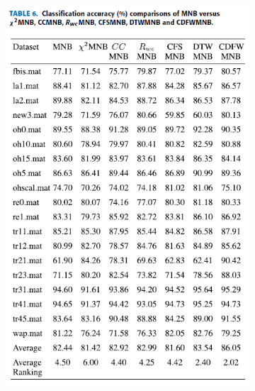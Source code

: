 \documentclass[12pt, a4paper]{article}
\begin{document}
\begin{figure}
\begin{subfigure}{0.45\linewidth}
        \includegraphics[width=\linewidth]{images/article3/table6.png}
        \caption{}
        \label{a3_table6}
    \end{subfigure}
    \newline
    \begin{subfigure}{0.45\linewidth}
        \centering

\end{subfigure}
\end{figure}
\end{document}
